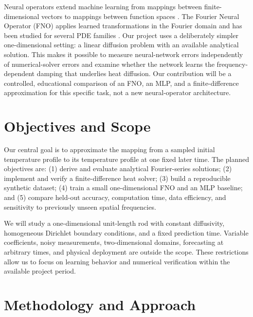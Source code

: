 \documentclass{article}
\begin{document}
Neural operators extend machine learning from mappings between finite-dimensional vectors to mappings between function spaces \citep{kovachki2023neural}. The Fourier Neural Operator (FNO) applies learned transformations in the Fourier domain and has been studied for several PDE families \citep{li2021fourier}. Our project uses a deliberately simpler one-dimensional setting: a linear diffusion problem with an available analytical solution. This makes it possible to measure neural-network errors independently of numerical-solver errors and examine whether the network learns the frequency-dependent damping that underlies heat diffusion. Our contribution will be a controlled, educational comparison of an FNO, an MLP, and a finite-difference approximation for this specific task, not a new neural-operator architecture.

\section{Objectives and Scope}
Our central goal is to approximate the mapping from a sampled initial temperature profile to its temperature profile at one fixed later time. The planned objectives are: (1) derive and evaluate analytical Fourier-series solutions; (2) implement and verify a finite-difference heat solver; (3) build a reproducible synthetic dataset; (4) train a small one-dimensional FNO and an MLP baseline; and (5) compare held-out accuracy, computation time, data efficiency, and sensitivity to previously unseen spatial frequencies.

We will study a one-dimensional unit-length rod with constant diffusivity, homogeneous Dirichlet boundary conditions, and a fixed prediction time. Variable coefficients, noisy measurements, two-dimensional domains, forecasting at arbitrary times, and physical deployment are outside the scope. These restrictions allow us to focus on learning behavior and numerical verification within the available project period.

\section{Methodology and Approach}
\end{document}
